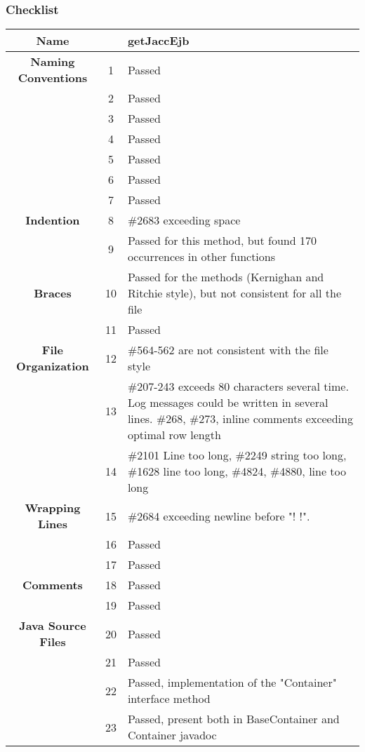 \documentclass[11pt, a4paper,titlepage]{article}
\begin{document}
\subsubsection{Checklist}
\begin{tabularx}{\textwidth}{| c |c |X |}
	\hline \textbf{Name} & & getJaccEjb \\
	\hline \textbf{Naming Conventions} & 1  & Passed  \\
	\hline  & 2 & Passed \\
	\hline  & 3 & Passed \\
	\hline  & 4 & Passed \\
	\hline  & 5 & Passed \\
	\hline  & 6 & Passed \\
	\hline  & 7 & Passed \\
	\hline \textbf{Indention} & 8 & \#2683 exceeding space
	\\
	\hline  & 9 & Passed for this method, but found 170 occurrences in other functions
	\\
	\hline \textbf{Braces} & 10 & Passed for the methods (Kernighan and Ritchie style), but not consistent for all the file \\
	\hline  & 11 & Passed \\
	\hline \textbf{File Organization} & 12 & \#564-562 are not consistent with the file style
	\\
	\hline  & 13 & \#207-243 exceeds 80 characters several time. Log messages could be written in several lines.
	\#268, \#273, inline comments exceeding optimal row length
	\\
	\hline  & 14 & \#2101 Line too long, \#2249 string too long, \#1628 line too long, \#4824, \#4880, line too long \\
	\hline \textbf{Wrapping Lines} & 15 & \#2684 exceeding newline before "! !".
	\\
	\hline  & 16 & Passed \\
	\hline  & 17 & Passed \\
	\hline \textbf{Comments} & 18 & Passed \\
	\hline  & 19 & Passed \\
	\hline \textbf{Java Source Files} & 20 & Passed \\
	\hline  & 21 & Passed \\
	\hline  & 22 & Passed, implementation of the "Container" interface method
	\\
	\hline  & 23 & Passed, present both in BaseContainer and Container javadoc
	\\
	\hline
\end{tabularx}
\end{document}

